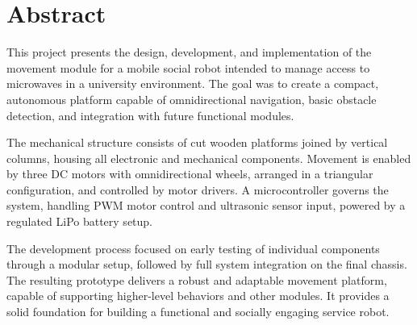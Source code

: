\section*{Abstract}

This project presents the design, development, and implementation of the movement module for a mobile social robot intended to manage access to microwaves in a university environment. The goal was to create a compact, autonomous platform capable of omnidirectional navigation, basic obstacle detection, and integration with future functional modules.

The mechanical structure consists of cut wooden platforms joined by vertical columns, housing all electronic and mechanical components. Movement is enabled by three DC motors with omnidirectional wheels, arranged in a triangular configuration, and controlled by motor drivers. A microcontroller governs the system, handling PWM motor control and ultrasonic sensor input, powered by a regulated LiPo battery setup.

The development process focused on early testing of individual components through a modular setup, followed by full system integration on the final chassis. The resulting prototype delivers a robust and adaptable movement platform, capable of supporting higher-level behaviors and other modules. It provides a solid foundation for building a functional and socially engaging service robot.

